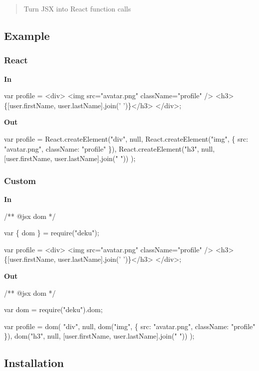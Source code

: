 \begin{quote}
Turn J\+SX into React function calls \end{quote}


\subsection*{Example}

\subsubsection*{React}

{\bfseries In}


\begin{DoxyCode}
var profile = <div>
  <img src="avatar.png" className="profile" />
  <h3>\{[user.firstName, user.lastName].join(' ')\}</h3>
</div>;
\end{DoxyCode}


{\bfseries Out}


\begin{DoxyCode}
var profile = React.createElement("div", null,
  React.createElement("img", \{ src: "avatar.png", className: "profile" \}),
  React.createElement("h3", null, [user.firstName, user.lastName].join(" "))
);
\end{DoxyCode}


\subsubsection*{Custom}

{\bfseries In}


\begin{DoxyCode}
/** @jsx dom */

var \{ dom \} = require("deku");

var profile = <div>
  <img src="avatar.png" className="profile" />
  <h3>\{[user.firstName, user.lastName].join(' ')\}</h3>
</div>;
\end{DoxyCode}


{\bfseries Out}


\begin{DoxyCode}
/** @jsx dom */

var dom = require("deku").dom;

var profile = dom( "div", null,
  dom("img", \{ src: "avatar.png", className: "profile" \}),
  dom("h3", null, [user.firstName, user.lastName].join(" "))
);
\end{DoxyCode}


\subsection*{Installation}


